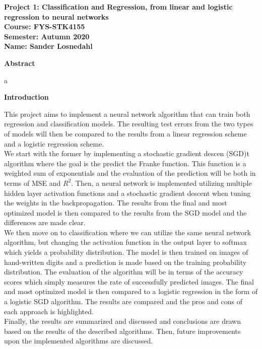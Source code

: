 \documentclass[12pt,a4paper]{article}
\begin{document}
\begin{center}
\LARGE{\textbf{Project 1: Classification and Regression, from linear and logistic regression to neural networks}}
\\
\large{\textbf{Course: FYS-STK4155}}
\\
\large{\textbf{Semester: Autumn 2020}}
\\
\large{\textbf{Name: Sander Losnedahl}}
\end{center}

\begin{center}
\Large{\textbf{Abstract}}
\end{center}

\noindent a

\newpage

\begin{center}
\Large{\textbf{Introduction}}
\end{center}

\noindent This project aims to implement a neural network algorithm that can train both regression and classification models. The resulting test errors from the two types of models will then be compared to the results from a linear regression scheme and a logistic regression scheme. 
\\
We start with the former by implementing a stochastic gradient descen (SGD)t algorithm where the goal is the predict the Franke function. This function is a weighted sum of exponentials and the evaluation of the prediction will be both in terms of MSE and $R^2$. Then, a neural network is implemented utilizing multiple hidden layer activation functions and a stochastic gradient descent when tuning the weights in the backpropagation. The results from the final and most optimized model is then compared to the results from the SGD model and the differences are made clear.
\\
We then move on to classification where we can utilize the same neural network algorithm, but changing the activation function in the output layer to softmax which yields a probability distribution. The model is then trained on images of hand-written digits and a prediction is made based on the training probability distribution. The evaluation of the algorithm will be in terms of the accuracy scores which simply measures the rate of successfully predicted images. The final and most optimized model is then compared to a logistic regression in the form of a logistic SGD algorithm. The results are compared and the pros and cons of each approach is highlighted.
\\
Finally, the results are summarized and discussed and conclusions are drawn based on the results of the described algorithms. Then, future improvements upon the implemented algorithms are discussed.
\end{document}
